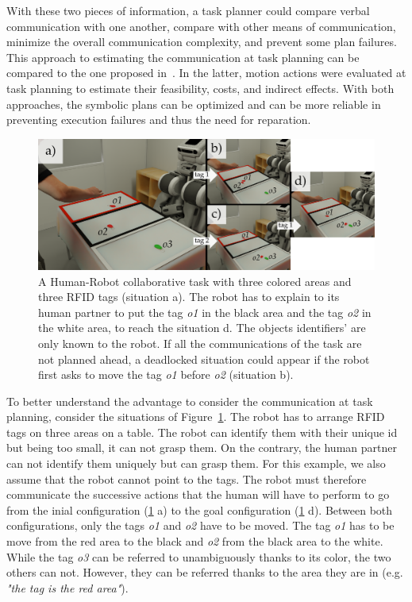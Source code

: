 With these two pieces of information, a task planner could compare verbal communication with one another, compare with other means of communication, minimize the overall communication complexity, and prevent some plan failures. This approach to estimating the communication at task planning can be compared to the one proposed in~\cite{lallement_2016_symbolic}. In the latter, motion actions were evaluated at task planning to estimate their feasibility, costs, and indirect effects. With both approaches, the symbolic plans can be optimized and can be more reliable in preventing execution failures and thus the need for reparation.


\begin{figure}[t!]
\centering
\includegraphics[width=\textwidth]{figures/chapter5/intro/intro.png}
\caption{\label{fig:chap5_intro} A Human-Robot collaborative task with three colored areas and three RFID tags (situation a). The robot has to explain to its human partner to put the tag \textit{o1} in the black area and the tag \textit{o2} in the white area, to reach the situation d. The objects identifiers' are only known to the robot.
If all the communications of the task are not planned ahead, a deadlocked situation could appear if the robot first asks to move the tag \textit{o1} before \textit{o2} (situation b).}
\end{figure}

To better understand the advantage to consider the communication at task planning, consider the situations of Figure~\ref{fig:chap5_intro}. The robot has to arrange RFID tags on three areas on a table. The robot can identify them with their unique id but being too small, it can not grasp them. On the contrary, the human partner can not identify them uniquely but can grasp them. For this example, we also assume that the robot cannot point to the tags. The robot must therefore communicate the successive actions that the human will have to perform to go from the inial configuration (\ref{fig:chap5_intro} a) to the goal configuration (\ref{fig:chap5_intro} d). Between both configurations, only the tags \textit{o1} and \textit{o2} have to be moved. The tag \textit{o1} has to be move from the red area to the black and \textit{o2} from the black area to the white. While the tag \textit{o3} can be referred to unambiguously thanks to its color, the two others can not. However, they can be referred thanks to the area they are in (e.g. \textit{"the tag is the red area"}).

